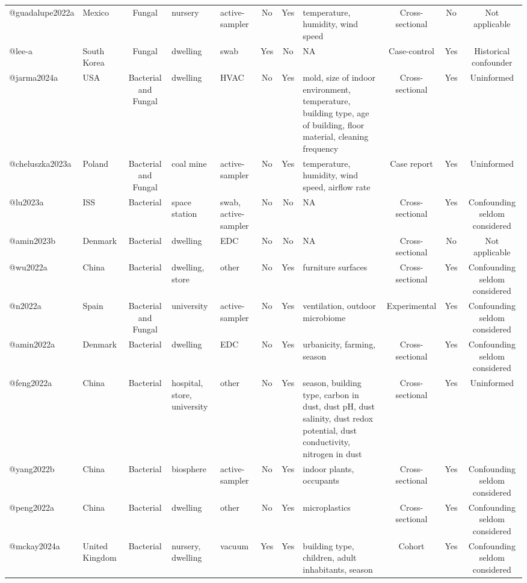 \begin{longtable}{llcllcclccc}
@guadalupe2022a & Mexico & Fungal & nursery & active-sampler & No & Yes & temperature, humidity, wind speed & Cross-sectional & No & Not applicable \\ 
@lee-a & South Korea & Fungal & dwelling & swab & Yes & No & NA & Case-control & Yes & Historical confounder \\ 
@jarma2024a & USA & Bacterial and Fungal & dwelling & HVAC & No & Yes & mold, size of indoor environment, temperature, building type, age of building, floor material, cleaning frequency & Cross-sectional & Yes & Uninformed \\ 
@cheluszka2023a & Poland & Bacterial and Fungal & coal mine & active-sampler & No & Yes & temperature, humidity, wind speed, airflow rate & Case report & Yes & Uninformed \\ 
@lu2023a & ISS & Bacterial & space station & swab, active-sampler & No & No & NA & Cross-sectional & Yes & Confounding seldom considered \\ 
@amin2023b & Denmark & Bacterial & dwelling & EDC & No & No & NA & Cross-sectional & No & Not applicable \\ 
@wu2022a & China & Bacterial & dwelling, store & other & No & Yes & furniture surfaces & Cross-sectional & Yes & Confounding seldom considered \\ 
@n2022a & Spain & Bacterial and Fungal & university & active-sampler & No & Yes & ventilation, outdoor microbiome & Experimental & Yes & Confounding seldom considered \\ 
@amin2022a & Denmark & Bacterial & dwelling & EDC & No & Yes & urbanicity, farming, season & Cross-sectional & Yes & Confounding seldom considered \\ 
@feng2022a & China & Bacterial & hospital, store, university & other & No & Yes & season, building type, carbon in dust, dust pH, dust salinity, dust redox potential, dust conductivity, nitrogen in dust & Cross-sectional & Yes & Uninformed \\ 
@yang2022b & China & Bacterial & biosphere & active-sampler & No & Yes & indoor plants, occupants & Cross-sectional & Yes & Confounding seldom considered \\ 
@peng2022a & China & Bacterial & dwelling & other & No & Yes & microplastics & Cross-sectional & Yes & Confounding seldom considered \\ 
@mckay2024a & United Kingdom & Bacterial & nursery, dwelling & vacuum & Yes & Yes & building type, children, adult inhabitants, season & Cohort & Yes & Confounding seldom considered \\ 

\end{longtable}
